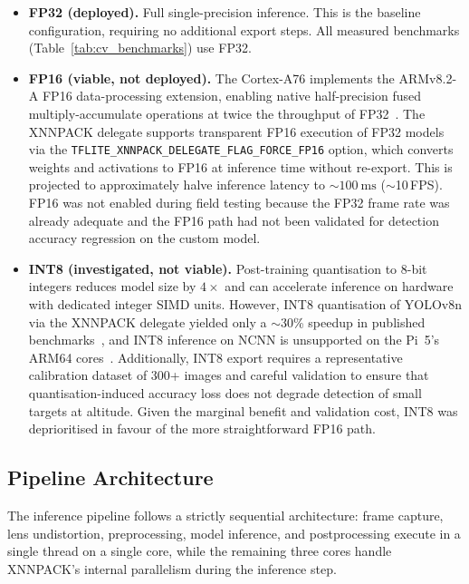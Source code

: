 \begin{itemize}
  \item \textbf{FP32 (deployed).}  Full single-precision inference.  This is the baseline configuration, requiring no additional export steps.  All measured benchmarks (Table~\ref{tab:cv_benchmarks}) use FP32.

  \item \textbf{FP16 (viable, not deployed).}  The Cortex-A76 implements the ARMv8.2-A FP16 data-processing extension, enabling native half-precision fused multiply-accumulate operations at twice the throughput of FP32~\cite{arm_a76}.  The XNNPACK delegate supports transparent FP16 execution of FP32 models via the \texttt{TFLITE\_XNNPACK\_\allowbreak{}DELEGATE\_FLAG\_FORCE\_FP16} option, which converts weights and activations to FP16 at inference time without re-export.  This is projected to approximately halve inference latency to ${\sim}\SI{100}{\milli\second}$ (${\sim}$10\,FPS).  FP16 was not enabled during field testing because the FP32 frame rate was already adequate and the FP16 path had not been validated for detection accuracy regression on the custom model.

  \item \textbf{INT8 (investigated, not viable).}  Post-training quantisation to 8-bit integers reduces model size by $4\times$ and can accelerate inference on hardware with dedicated integer SIMD units.  However, INT8 quantisation of YOLOv8n via the XNNPACK delegate yielded only a ${\sim}$30\% speedup in published benchmarks~\cite{tflite}, and INT8 inference on NCNN is unsupported on the Pi~5's ARM64 cores~\cite{ncnn}.  Additionally, INT8 export requires a representative calibration dataset of 300+ images and careful validation to ensure that quantisation-induced accuracy loss does not degrade detection of small targets at altitude.  Given the marginal benefit and validation cost, INT8 was deprioritised in favour of the more straightforward FP16 path.
\end{itemize}

\subsection{Pipeline Architecture}\label{sec:cv:inference:pipeline}

The inference pipeline follows a strictly sequential architecture: frame capture, lens undistortion, preprocessing, model inference, and postprocessing execute in a single thread on a single core, while the remaining three cores handle XNNPACK's internal parallelism during the inference step.

